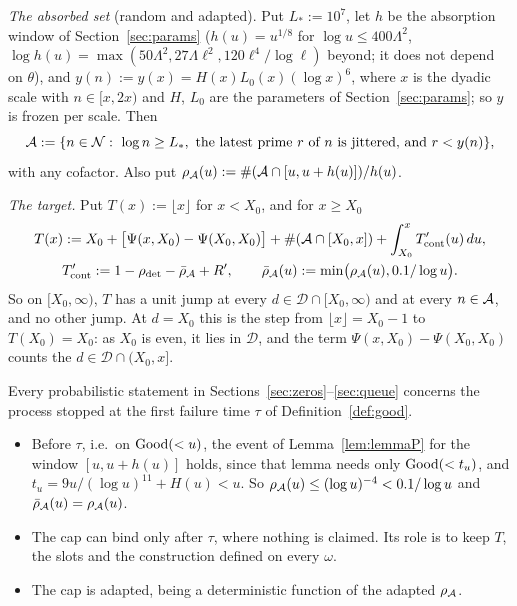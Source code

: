 \emph{The absorbed set} (random and adapted). Put $L_*:=10^7$, let $h$ be the absorption window of
Section~\ref{sec:params} ($h(u)=u^{1/8}$ for $\log u\le400\Lambda^2$, $\log h(u)=\max(50\Lambda^2,27\Lambda\ell^2,120\ell^4/\log\ell)$
beyond; it does not depend on $\theta$), and $y(n):=y(x)=H(x)L_0(x)(\log x)^6$, where
$x$ is the dyadic scale with $n\in[x,2x)$ and $H$, $L_0$ are the parameters of Section~\ref{sec:params}; so $y$ is frozen per
scale. Then
\begin{equation}\label{eq:absorbed}
  \mathcal{A}:=\{n\in\mathcal{N}:\ \log n\ge L_*,\ \text{the latest prime $r$ of $n$ is jittered, and } r<y(n)\},
\end{equation}
with any cofactor. Also put $\rho_{\mathcal{A}}(u):=\#(\mathcal{A}\cap[u,u+h(u)])/h(u)$.

\emph{The target.} Put $T(x):=\lfloor x\rfloor$ for $x<X_0$, and for $x\ge X_0$
\begin{equation}\label{eq:target}
\begin{gathered}
  T(x):=X_0+\bigl[\Psi(x,X_0)-\Psi(X_0,X_0)\bigr]+\#(\mathcal{A}\cap[X_0,x])+\int_{X_0}^xT'_{\mathrm{cont}}(u)\,du,\\
  T'_{\mathrm{cont}}:=1-\rho_{\mathrm{det}}-\bar\rho_{\mathcal{A}}+R',\qquad \bar\rho_{\mathcal{A}}(u):=\min\bigl(\rho_{\mathcal{A}}(u),0.1/\log u\bigr).
\end{gathered}
\end{equation}
So on $[X_0,\infty)$, $T$ has a unit jump at every $d\in\mathcal D\cap[X_0,\infty)$ and at every $n\in\mathcal{A}$, and no other jump. At
$d=X_0$ this is the step from $\lfloor x\rfloor=X_0-1$ to $T(X_0)=X_0$: as $X_0$ is even, it lies in $\mathcal D$, and the term
$\Psi(x,X_0)-\Psi(X_0,X_0)$ counts the $d\in\mathcal D\cap(X_0,x]$.

\begin{remark}\label{rem:stopped}
Every probabilistic statement in Sections~\ref{sec:zeros}--\ref{sec:queue} concerns the process stopped at the first failure time
$\tau$ of Definition~\ref{def:good}.
\begin{itemize}
\item Before $\tau$, i.e.\ on $\mathrm{Good}(<u)$, the event of Lemma~\ref{lem:lemmaP} for the window $[u,u+h(u)]$ holds, since that
lemma needs only $\mathrm{Good}(<t_u)$, and $t_u=9u/(\log u)^{11}+H(u)<u$.
So $\rho_{\mathcal{A}}(u)\le(\log u)^{-4}<0.1/\log u$ and $\bar\rho_{\mathcal{A}}(u)=\rho_{\mathcal{A}}(u)$.
\item The cap can bind only after $\tau$, where nothing is claimed. Its role is to keep $T$, the slots and the construction defined on
every $\omega$.
\item The cap is adapted, being a deterministic function of the adapted $\rho_{\mathcal{A}}$.
\end{itemize}
\end{remark}

